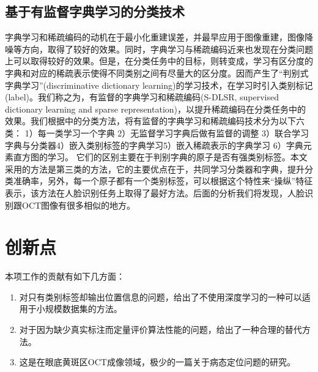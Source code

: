     \subsection{基于有监督字典学习的分类技术}
    字典学习和稀疏编码的动机在于最小化重建误差，并最早应用于图像重建，图像降噪等方向，取得了较好的效果。同时，字典学习与稀疏编码近来也发现在分类问题上可以取得较好的效果。但是，在分类任务中的目标，则转变成，学习有区分度的字典和对应的稀疏表示使得不同类别之间有尽量大的区分度。因而产生了“判别式字典学习”(discriminative dictionary learning)的学习技术，在学习时引入类别标记(label)。我们称之为，有监督的字典学习和稀疏编码(S-DLSR, supervised dictionary learning and sparse representation)，以提升稀疏编码在分类任务中的效果。我们根据中的分类方法，将有监督的字典学习和稀疏编码技术分为以下六类： 1）每一类学习一个字典\cite{wright2009robust,yang2010metaface} 2）无监督学习字典后做有监督的调整\cite{fulkerson2008localizing,winn2005object} 3）联合学习字典与分类器\cite{mairal2008discriminative,jiang2013label,zhang2010discriminative,pham2008joint,yang2008unifying}4）嵌入类别标签的字典学习5）嵌入稀疏表示的字典学习\cite{huang2006sparse,yang2011fisher,rodriguez2008sparse} \cite{gangeh2013kernelized,zhang2013simultaneous,lazebnik2009supervised}6）字典元素直方图的学习。\cite{lian2010probabilistic,zhang2009learning}
    它们的区别主要在于判别字典的原子是否有强类别标签。本文采用的方法是第三类\cite{jiang2013label}的方法，它的主要优点在于，共同学习分类器和字典，提升分类准确率，另外，每一个原子都有一个类别标签，可以根据这个特性来“操纵”特征表示，该方法在人脸识别任务上取得了最好方法。后面的分析我们将发现，人脸识别跟OCT图像有很多相似的地方。

\section{创新点}
    本项工作的贡献有如下几方面：
    \begin{enumerate}
        \item 对只有类别标签却输出位置信息的问题，给出了不使用深度学习的一种可以适用于小规模数据集的方法。
        \item 对于因为缺少真实标注而定量评价算法性能的问题，给出了一种合理的替代方法。
        \item 这是在眼底黄斑区OCT成像领域，极少的一篇关于病态定位问题的研究。
    \end{enumerate}
